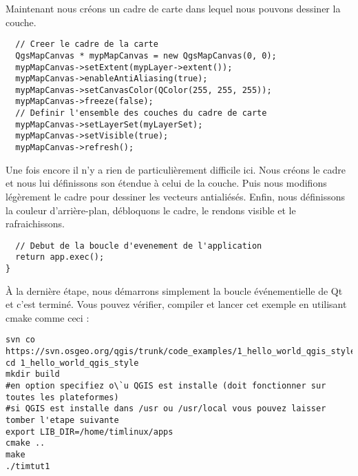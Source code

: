 Maintenant nous cr\'eons un cadre de carte dans lequel nous pouvons dessiner la 
couche.

\begin{verbatim}
  // Creer le cadre de la carte
  QgsMapCanvas * mypMapCanvas = new QgsMapCanvas(0, 0);
  mypMapCanvas->setExtent(mypLayer->extent());
  mypMapCanvas->enableAntiAliasing(true);
  mypMapCanvas->setCanvasColor(QColor(255, 255, 255));
  mypMapCanvas->freeze(false);
  // Definir l'ensemble des couches du cadre de carte
  mypMapCanvas->setLayerSet(myLayerSet);
  mypMapCanvas->setVisible(true);
  mypMapCanvas->refresh();

\end{verbatim}

Une fois encore il n'y a rien de particuli\`erement difficile ici. Nous cr\'eons le 
cadre et nous lui d\'efinissons son \'etendue \`a celui de la couche. Puis nous 
modifions l\'eg\`erement le cadre pour dessiner les vecteurs antiali\'es\'es. Enfin, nous 
d\'efinissons la couleur d'arri\`ere-plan, d\'ebloquons le cadre, le rendons visible 
et le rafraichissons.

\begin{verbatim}
  // Debut de la boucle d'evenement de l'application
  return app.exec();
}

\end{verbatim}

\`A la derni\`ere \'etape, nous d\'emarrons simplement la boucle \'ev\'enementielle de Qt et 
c'est termin\'e. Vous pouvez v\'erifier, compiler et lancer cet exemple en 
utilisant cmake comme ceci :

\begin{verbatim}
svn co
https://svn.osgeo.org/qgis/trunk/code_examples/1_hello_world_qgis_style
cd 1_hello_world_qgis_style
mkdir build
#en option specifiez o\`u QGIS est installe (doit fonctionner sur toutes les plateformes)
#si QGIS est installe dans /usr ou /usr/local vous pouvez laisser tomber l'etape suivante
export LIB_DIR=/home/timlinux/apps
cmake ..
make
./timtut1
\end{verbatim}

